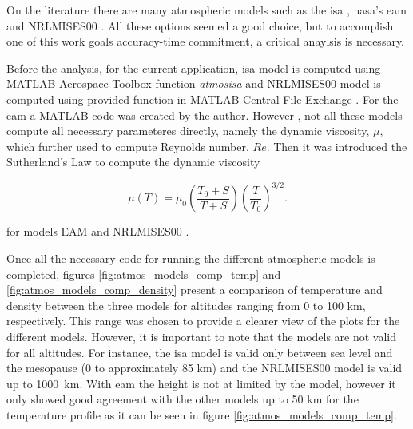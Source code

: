 On the literature there are many atmospheric models such as the \gls{isa} \cite{noauthor_iso_nodate}, \gls{nasa}'s \gls{eam} \cite{noauthor_earth_nodate} and NRLMISES00 \cite{picone_nrlmsise00_2002}. All these options seemed a good choice, but to accomplish one of  this work goals accuracy-time commitment, a critical anaylsis is necessary.

Before the analysis, for the current application, \gls{isa} model is computed using MATLAB \cite{matlab_version_2024} Aerospace Toolbox \cite{noauthor_aerospace_nodate} function \textit{atmosisa} \cite{noauthor_atmosisa_nodate} and NRLMISES00 model is computed using provided function in MATLAB \cite{matlab_version_2024} Central File Exchange \cite{noauthor_atmosphere_2025}. For the \gls{eam} a MATLAB \cite{matlab_version_2024} code was created by the author. However , not all these models compute all necessary parameteres directly, namely the dynamic viscosity, $\mu$, which further used to compute Reynolds number, $Re$. Then it was introduced the Sutherland's Law to compute the dynamic viscosity

\begin{equation}
    \mu(T) = \mu_0 \left( \frac{T_0 + S}{T + S} \right) \left( \frac{T}{T_0} \right)^{3/2}.
\end{equation}

\noindent for models EAM \cite {noauthor_earth_nodate, noauthor_atmosisa_nodate} and NRLMISES00 \cite{picone_nrlmsise00_2002, noauthor_atmosphere_2025}.

Once all the necessary code for running the different atmospheric models is completed, figures \ref{fig:atmos_models_comp_temp} and \ref{fig:atmos_models_comp_density} present a comparison of temperature and density between the three models for altitudes ranging from 0 to 100 \unit{\km}, respectively. This range was chosen to provide a clearer view of the plots for the different models. However, it is important to note that the models are not valid for all altitudes. For instance, the \gls{isa} model is valid only between sea level and the mesopause (0 to approximately 85 \unit{\km}) and the NRLMISES00 model is valid up to 1000~\unit{\km}. With \gls{eam} the height is not at limited by the model, however it only showed good agreement with the other models up to 50 \unit{\km} for the temperature profile as it can be seen in figure \ref{fig:atmos_models_comp_temp}.


